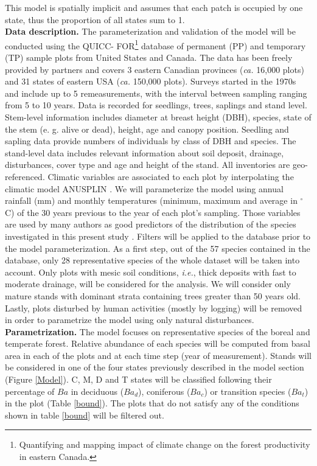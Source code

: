 This model is spatially implicit and assumes that each patch is occupied by
one state, thus the proportion of all states sum to 1. \\

\textbf{Data description.} The parameterization and validation of the model
will be conducted using the QUICC- FOR\footnote{Quantifying and mapping impact
of climate change on the forest productivity in eastern Canada.} database
of permanent (PP) and temporary (TP) sample plots from United
States and Canada. The data has been freely provided by partners and covers 3
eastern Canadian provinces (\textit{ca.} 16,000 plots) and 31 states of
eastern USA (\textit{ca.} 150,000 plots). Surveys started in the 1970s and
include up to 5 remeasurements, with the interval between sampling ranging
from 5 to 10 years. Data is recorded for seedlings, trees, saplings and stand
level. Stem-level information includes diameter at breast height (DBH),
species, state of the stem (e. g. alive or dead), height, age and canopy
position. Seedling and sapling data provide numbers of individuals by class of
DBH and species. The stand-level data includes relevant information about soil
deposit, drainage, disturbances, cover type and age and height of the stand.
All  inventories are geo-referenced. Climatic variables are associated to each
plot by interpolating  the climatic model ANUSPLIN \cite{McKenney2011} . We
will parameterize the model using annual rainfall (mm) and monthly
temperatures (minimum, maximum and average in \ensuremath{^\circ}C) of the 30
years previous to the year of each plot's sampling. Those variables are used
by many authors as good predictors of the distribution of the species
investigated in this present study \cite{Goldblum2010}. Filters will be
applied to the database prior to the model parameterization. As a first step,
out of the 57 species contained in the database, only 28 representative
species of the whole dataset will be taken into account. Only
plots with mesic soil conditions, \textit{i.e.}, thick deposits with fast to
moderate drainage, will be considered for the analysis. We will consider only
mature stands with dominant strata containing trees greater than 50 years old.
Lastly, plots disturbed by human activities (mostly by logging) will be
removed in order to parametrize the model using only natural disturbances. \\

\textbf{Parametrization.} The model focuses on representative species of the
boreal and temperate forest. Relative  abundance of each species will be
computed from basal area in each of the plots and at each time step (year of
measurement). Stands will be considered in one of the four states previously
described in the model section (Figure \ref{Model}). C, M, D and T states
will be classified following their percentage of $Ba$ in deciduous ($Ba_d$),
coniferous ($Ba_c$) or transition species ($Ba_t$) in the plot (Table
\ref{bound}). The plots that do not satisfy any of the conditions shown in
table \ref{bound} will be filtered out.\\

